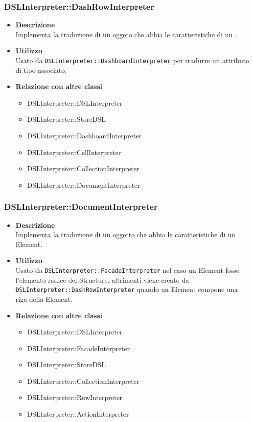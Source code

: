 \subsubsection{DSLInterpreter::DashRowInterpreter}
\begin{itemize}
\item \textbf{Descrizione} \hfill \\
Implementa la traduzione di un oggeto che abbia le caratteristiche di un .
\item \textbf{Utilizzo} \hfill \\
Usato da \texttt{DSLInterpreter::DashboardInterpreter} per tradurre un attributo di tipo  associato.
\item \textbf{Relazione con altre classi}
\begin{itemize}
\item DSLInterpreter::DSLInterpreter
\item DSLInterpreter::StoreDSL
\item DSLInterpreter::DashboardInterpreter
\item DSLInterpreter::CellInterpreter
\item DSLInterpreter::CollectionInterpreter
\item DSLInterpreter::DocumentInterpreter
\end{itemize}
\end{itemize}

\subsubsection{DSLInterpreter::DocumentInterpreter}
\begin{itemize}
\item \textbf{Descrizione} \hfill \\
  Implementa la traduzione di un oggetto che abbia le caratteristiche di un  Element.
\item \textbf{Utilizzo} \hfill \\
Usato da \texttt{DSLInterpreter::FacadeInterpreter} nel caso un  Element fosse l'elemento radice del  Structure, altrimenti viene creato da \\\texttt{DSLInterpreter::DashRowInterpreter} quando un  Element compone una riga della  Element.
\item \textbf{Relazione con altre classi}
  \begin{itemize}
  \item DSLInterpreter::DSLInterpreter
  \item DSLInterpreter::FacadeInterpreter
  \item DSLInterpreter::StoreDSL
  \item DSLInterpreter::CollectionInterpreter
  \item DSLInterpreter::RowInterpreter
  \item DSLInterpreter::ActionInterpreter
  \end{itemize}
\end{itemize}

